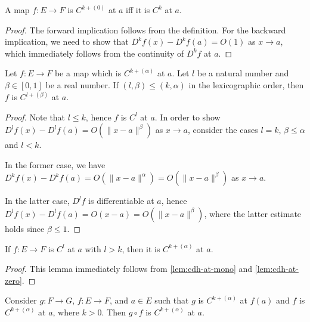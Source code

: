 \begin{lemma}%
  \label{lem:cdh-at-zero}
  \leanok
  A map \(f\colon E\to F\) is \(C^{k+(0)}\) at \(a\) iff it is \(C^{k}\) at \(a\).
\end{lemma}

\begin{proof}
  The forward implication follows from the definition.
  For the backward implication,
  we need to show that \(D^{k}f(x) - D^{k}f(a)=O(1)\) as \(x\to a\),
  which immediately follows from the continuity of \(D^{k}f\) at \(a\).
\end{proof}

\begin{lemma}%
  \label{lem:cdh-at-mono}
  Let \(f\colon E\to F\) be a map which is \(C^{k+(\alpha)}\) at \(a\).
  Let \(l\) be a natural number and \(\beta \in [0, 1]\) be a real number.
  If \((l, \beta) \le (k, \alpha)\) in the lexicographic order,
  then \(f\) is \(C^{l+(\beta)}\) at \(a\).
\end{lemma}

\begin{proof}
  Note that \(l\le k\), hence \(f\) is \(C^{l}\) at \(a\).
  In order to show \(D^{l}f(x) - D^{l}f(a) = O(\|x - a\|^{\beta})\) as \(x\to a\),
  consider the cases \(l = k\), \(\beta \le \alpha\) and \(l < k\).

  In the former case, we have \(D^{k}f(x) - D^{k}f(a) = O\left(\|x - a\|^{\alpha}\right)=O\left(\|x - a\|^{\beta}\right)\) as \(x\to a\).

  In the latter case, \(D^{l}f\) is differentiable at \(a\), hence \(D^{l}f(x)-D^{l}f(a)=O(x - a)=O(\|x - a\|^{\beta})\),
  where the latter estimate holds since \(\beta \le 1\).
\end{proof}

\begin{lemma}%
  \label{lem:cdh-at-of-contDiffAt}
  If \(f\colon E\to F\) is \(C^{l}\) at \(a\) with \(l > k\),
  then it is \(C^{k+(\alpha)}\) at \(a\).
\end{lemma}
\begin{proof}
  This lemma immediately follows
  from \autoref{lem:cdh-at-mono} and \autoref{lem:cdh-at-zero}.
\end{proof}

\begin{lemma}%
  \label{lem:cdh-at-comp}
  Consider \(g\colon F \to G\), \(f\colon E \to F\), and \(a \in E\)
  such that \(g\) is \(C^{k+(\alpha)}\) at \(f(a)\) and \(f\) is \(C^{k+(\alpha)}\) at \(a\), where \(k > 0\).
  Then \(g\circ f\) is \(C^{k+(\alpha)}\) at \(a\).
\end{lemma}

